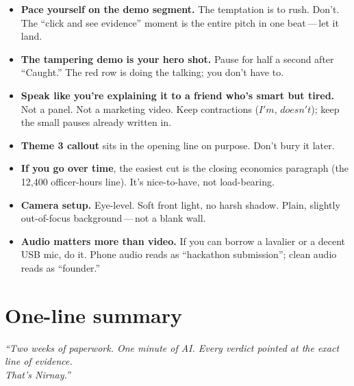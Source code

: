 \documentclass[11pt,a4paper]{article}
\begin{document}
\begin{itemize}[leftmargin=*, itemsep=4pt]
  \item \textbf{Pace yourself on the demo segment.} The temptation is to rush. Don't. The ``click and see evidence'' moment is the entire pitch in one beat\,---\,let it land.
  \item \textbf{The tampering demo is your hero shot.} Pause for half a second after ``Caught.'' The red row is doing the talking; you don't have to.
  \item \textbf{Speak like you're explaining it to a friend who's smart but tired.} Not a panel. Not a marketing video. Keep contractions ($I'm$, $doesn't$); keep the small pauses already written in.
  \item \textbf{Theme 3 callout} sits in the opening line on purpose. Don't bury it later.
  \item \textbf{If you go over time}, the easiest cut is the closing economics paragraph (the 12{,}400 officer-hours line). It's nice-to-have, not load-bearing.
  \item \textbf{Camera setup.} Eye-level. Soft front light, no harsh shadow. Plain, slightly out-of-focus background\,---\,not a blank wall.
  \item \textbf{Audio matters more than video.} If you can borrow a lavalier or a decent USB mic, do it. Phone audio reads as ``hackathon submission''; clean audio reads as ``founder.''
\end{itemize}

\vspace{10pt}

\section*{One-line summary}

\begin{tcolorbox}[
  enhanced, colback=accent!8, colframe=accent, boxrule=0.6pt, arc=3pt,
  left=12pt, right=12pt, top=10pt, bottom=10pt
]
\centering\large\itshape
``Two weeks of paperwork. One minute of AI. Every verdict pointed at the exact line of evidence.\\
That's Nirnay.''
\end{tcolorbox}
\end{document}
